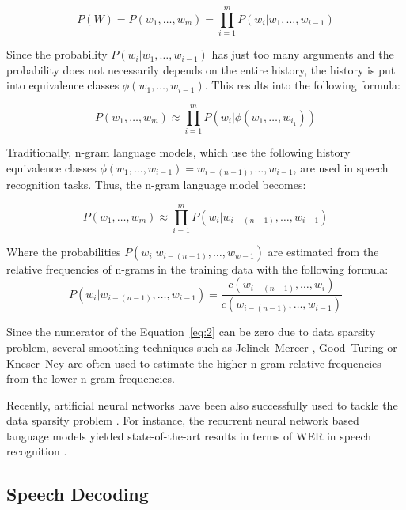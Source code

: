 \begin{equation}
  P(W) = P(w_1,\dots,w_m) = \prod\limits_{i=1}^{m} P(w_i|w_1,\dots,w_{i-1})
\end{equation}

Since the probability $P(w_i|w_1,\dots,w_{i-1})$ has just too many arguments
  and the probability does not necessarily depends on the entire history,
  the history is put into equivalence classes $\phi(w_1,\dots,w_{i-1})$.
This results into the following formula:

\begin{equation}
  P(w_1,\dots,w_m) \approx \prod\limits_{i=1}^{m} P(w_i|\phi(w_1,\dots,w_{i_1}))
\end{equation}

Traditionally, n-gram language models,
  which use the following history equivalence classes $\phi(w_1,\dots,w_{i-1}) = w_{i-(n-1)},\dots,w_{i-1}$,
  are used in speech recognition tasks.
Thus, the n-gram language model becomes:

\begin{equation}
  P(w_1,\dots,w_m) \approx \prod\limits_{i=1}^{m} P(w_i|w_{i-(n-1)},\dots,w_{i-1})
\end{equation}

Where the probabilities $P(w_i|w_{i-(n-1)},\dots,w_{w-1})$ are estimated from the relative frequencies of n-grams in the training data with the following formula:
\begin{equation}
  \label{eq:2}
  P(w_i|w_{i-(n-1)},\dots,w_{i-1}) = \frac{c(w_{i-(n-1)},\dots,w_i)}{c(w_{i-(n-1)},\dots,w_{i-1})}
\end{equation}


Since the numerator of the Equation~\ref{eq:2} can be zero due to data sparsity problem,
  several smoothing techniques such as
  Jelinek--Mercer \cite{jelinek1980interpolated},
  Good--Turing \cite{gale1995good}
  or Kneser--Ney \cite{kneser1995improved} are often used to estimate the higher n-gram relative frequencies from the lower n-gram frequencies.

Recently, artificial neural networks have been also successfully used to tackle the data sparsity problem \cite{bengio2003neural}.
For instance, the recurrent neural network based language models yielded state-of-the-art results in terms of WER in speech recognition \cite{mikolov2010recurrent}.


\subsection{Speech Decoding}


